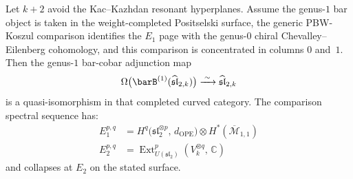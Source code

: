 \begin{theorem}
\label{thm:sl2-genus1-inversion}
Let $k+2$ avoid the Kac--Kazhdan resonant hyperplanes.  Assume the
genus-$1$ bar object is taken in the weight-completed Positselski
surface, the generic PBW-Koszul comparison identifies the $E_1$ page
with the genus-$0$ chiral Chevalley--Eilenberg cohomology, and this
comparison is concentrated in columns $0$ and~$1$.  Then the genus-$1$
bar-cobar adjunction map
\begin{equation}
\Omega\bigl(\barB^{(1)}(\widehat{\mathfrak{sl}}_{2,k})\bigr) \xrightarrow{\;\sim\;} \widehat{\mathfrak{sl}}_{2,k}
\end{equation}
is a quasi-isomorphism in that completed curved category. The
comparison spectral sequence has:
\begin{align}
E_1^{p,q} &= H^q\bigl(\mathfrak{sl}_2^{\otimes p},\, d_{\mathrm{OPE}}\bigr) \otimes H^*(\overline{\mathcal{M}}_{1,1}) \\
E_2^{p,q} &= \operatorname{Ext}^p_{U(\mathfrak{sl}_2)}(V_k^{\otimes q},\, \mathbb{C})
\end{align}
and collapses at $E_2$ on the stated surface.
\end{theorem}

